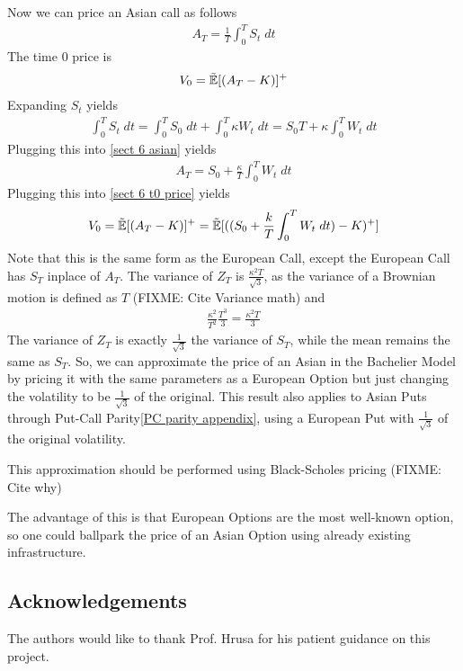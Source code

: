 \documentclass[reqno]{amsart}
\newcommand{\rE}[1]{\tilde{\E}[#1]}
\begin{document}
Now we can price an Asian call as follows
\begin{align} \label{sect 6 asian}
     A_T = \frac{1}{T} \int_0^T S_t \; dt
\end{align}
The time 0 price is
\begin{align} \label{sect 6 t0 price}
     V_0 = \rE{(A_T-K)}^{+}
\end{align}
Expanding $S_t$ yields
\begin{align}
     \int_0^T S_t \; dt = \int_0^T S_0 \; dt + \int_0^T \kappa W_t \; dt = S_0T + \kappa \int_0^T W_t \; dt
\end{align}
Plugging this into \eqref{sect 6 asian} yields
\begin{align} 
     A_T = S_0 + \frac{\kappa}{T} \int_0^T W_t \; dt
\end{align}
Plugging this into \eqref{sect 6 t0 price} yields
\begin{align}
     V_0 = \rE{(A_T-K)}^{+} = \rE{({(S_0 + \frac{k}{T} \int_0^T W_t \; dt) - K})^+} 
\end{align}
Note that this is the same form as the European Call, except the European Call has $S_T$ inplace of $A_T$.
The variance of $Z_T$ is $\frac{\kappa^2T}{\sqrt{3}}$, as the variance of a Brownian motion is defined as $T$ (FIXME: Cite Variance math) and 
\begin{align}
     \frac{\kappa^2}{T^2} \frac{T^3}{3}= \frac{\kappa^2 T}{3}
\end{align}
The variance of $Z_T$ is exactly $\frac{1}{\sqrt{3}}$ the variance of $S_T$, while the mean remains the same as $S_T$.
So, we can approximate the price of an Asian in the Bachelier Model by pricing it with the same parameters as a European Option 
but just changing the volatility to be $\frac{1}{\sqrt{3}}$ of the original. 
This result also applies to Asian Puts through Put-Call Parity\eqref{PC parity appendix}, 
using a European Put with $\frac{1}{\sqrt{3}}$ of the original volatility.

This approximation should be performed using Black-Scholes pricing (FIXME: Cite why)

The advantage of this is that European Options are the most well-known option, so one could ballpark 
the price of an Asian Option using already existing infrastructure.


\subsection*{Acknowledgements} The authors would like to thank Prof. Hrusa for his patient guidance on this project.  
\end{document}
